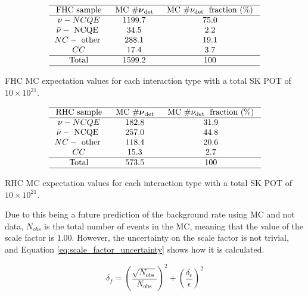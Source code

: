\begin{table}
    $$
    \begin{array}{ccc}
    \hline \text { FHC sample } & \text { MC } \# \boldsymbol{\nu}_{\text {det }} & \text { MC } \# \nu_{\text {det }} \text { fraction (\%) } \\
    \hline \nu-N C Q E & 1199.7 & 75.0 \\
    \bar{\nu}-\text { NCQE } & 34.5 & 2.2 \\
    N C-\text { other } & 288.1 & 19.1 \\
    C C & 17.4 & 3.7\\
    \hline \text { Total } & 1599.2 & 100 \\
    \hline
    \end{array}
    $$
    \caption{FHC MC expectation values for each interaction type with a total SK POT of $10 \times 10^{21}$. }
    \label{table:nu_FHC_mc}
\end{table}


\begin{table}
    $$
    \begin{array}{ccc}
    \hline \text { RHC sample } & \text { MC } \# \boldsymbol{\nu}_{\text {det }} & \text { MC } \# \nu_{\text {det }} \text { fraction (\%) } \\
    \hline \nu-N C Q E & 182.8 & 31.9 \\
    \bar{\nu}-\text { NCQE } & 257.0 & 44.8 \\
    N C-\text { other } & 118.4 & 20.6 \\
    C C & 15.3 & 2.7 \\
    \hline \text { Total } & 573.5 & 100 \\
    \hline
    \end{array}
    $$
    \caption{RHC MC expectation values for each interaction type with a total SK POT of $10 \times 10^{21}$.}
    \label{table:nu_RHC_mc}
\end{table}

Due to this being a future prediction of the background rate using MC and not data, $N_{obs}$ is the total number of events in the MC, meaning that the value of the scale factor is 1.00. However, the uncertainty on the scale factor is not trivial, and Equation \ref{eq:scale_factor_uncertainty} shows how it is calculated.

\begin{equation}
    \delta_{f} = \left({\frac{\sqrt{N_{\text{obs}}}}{N_{\text{obs}}}}\right)^{2} + \left({\frac{\delta_{\epsilon}}{\epsilon}}\right)^{2}
\label{eq:scale_factor_uncertainty}
\end{equation}

